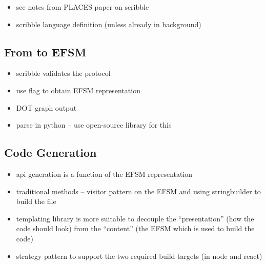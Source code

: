 \begin{itemize}
\item see notes from PLACES paper on scribble
\item scribble language definition (unless already in background)
\end{itemize}

\subsection{From  to EFSM}
\label{subsection:efsm}

\begin{itemize}
\item scribble validates the protocol
\item use flag to obtain EFSM representation
\item DOT graph output
\item parse in python -- use open-source library for this
\end{itemize}

\subsection{Code Generation}
\label{subsection:apigen}

\begin{itemize}
\item api generation is a function of the EFSM representation
\item traditional methods -- visitor pattern on the EFSM and using stringbuilder to build the file
\item templating library is more suitable to decouple the ``presentation'' (how the code should look) from the ``content'' (the EFSM which is used to build the code)
\item strategy pattern to support the two required build targets (in node and react)
\end{itemize}